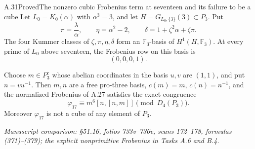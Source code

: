 \begin{statement}{A.31}{Proved}{The nonzero cubic Frobenius term at seventeen and its failure to be a cube}
Let $L_0=K_0(\alpha)$ with $\alpha^3=3$, and
let $H=G_{L_0,\{3\}}(3)\subset P_3$.
Put
\[
 \pi=\frac{\lambda}{\alpha},\qquad
 \eta=\alpha^2-2,\qquad
 \delta=1+\zeta^2\alpha+\zeta\pi.
 \tag{A.31.1}
\]
The four Kummer classes of
$\zeta,\pi,\eta,\delta$ form an
$\mathbb F_3$-basis of $H^1(H,\mathbb F_3)$.
At every prime of $L_0$ above seventeen,
the Frobenius row on this basis is
\[
                         (0,0,0,1).
 \tag{A.31.2}
\]

Choose $m\in P_3^c$ whose abelian
coordinates in the basis $u,v$ are
$(1,1)$, and put $n=vu^{-1}$.
Then $m,n$ are a free pro-three
basis, $c(m)=m$, $c(n)=n^{-1}$,
and the normalized Frobenius
of A.27 satisfies the exact congruence
\[
 \varphi_{17}\equiv
       m^6[n,[n,m]]\pmod{D_4(P_3)}.
 \tag{A.31.3}
\]
Moreover $\varphi_{17}$ is not a cube
of any element of $P_3$.
\par\smallskip\noindent\emph{Manuscript comparison: \S51.16,
folios 733v--736v, scans 172--178, formulas (371)--(379);
the explicit nonprimitive Frobenius in Tasks A.6 and B.4.}
\end{statement}
